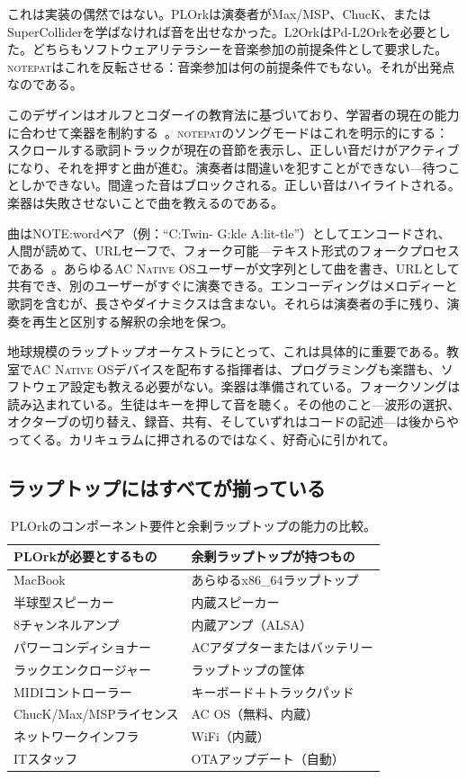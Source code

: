 \documentclass[10pt,letterpaper,twocolumn]{article}
\newcommand{\acos}{\textsc{AC Native OS}}
\newcommand{\np}{\textsc{notepat}}
\begin{document}
これは実装の偶然ではない。PLOrkは演奏者がMax/MSP、ChucK、またはSuperColliderを学ばなければ音を出せなかった。L2OrkはPd-L2Orkを必要とした。どちらもソフトウェアリテラシーを音楽参加の前提条件として要求した。\np{}はこれを反転させる：音楽参加は何の前提条件でもない。それが出発点なのである。

このデザインはオルフとコダーイの教育法に基づいており、学習者の現在の能力に合わせて楽器を制約する~\citep{scudder2026folksongs}。\np{}のソングモードはこれを明示的にする：スクロールする歌詞トラックが現在の音節を表示し、正しい音だけがアクティブになり、それを押すと曲が進む。演奏者は間違いを犯すことができない---待つことしかできない。間違った音はブロックされる。正しい音はハイライトされる。楽器は失敗させないことで曲を教えるのである。

曲はNOTE:wordペア（例：``C:Twin- G:kle A:lit-tle''）としてエンコードされ、人間が読めて、URLセーフで、フォーク可能---テキスト形式のフォークプロセスである~\citep{scudder2026folksongs}。あらゆる\acos{}ユーザーが文字列として曲を書き、URLとして共有でき、別のユーザーがすぐに演奏できる。エンコーディングはメロディーと歌詞を含むが、長さやダイナミクスは含まない。それらは演奏者の手に残り、演奏を再生と区別する解釈の余地を保つ。

地球規模のラップトップオーケストラにとって、これは具体的に重要である。教室で\acos{}デバイスを配布する指揮者は、プログラミングも楽譜も、ソフトウェア設定も教える必要がない。楽器は準備されている。フォークソングは読み込まれている。生徒はキーを押して音を聴く。その他のこと---波形の選択、オクターブの切り替え、録音、共有、そしていずれはコードの記述---は後からやってくる。カリキュラムに押されるのではなく、好奇心に引かれて。

\subsection{ラップトップにはすべてが揃っている}

\begin{table}[h]
\small
\centering
\begin{tabular}{ll}
\toprule
\textbf{PLOrkが必要とするもの} & \textbf{余剰ラップトップが持つもの} \\
\midrule
MacBook & あらゆるx86\_64ラップトップ \\
半球型スピーカー & 内蔵スピーカー \\
8チャンネルアンプ & 内蔵アンプ（ALSA） \\
パワーコンディショナー & ACアダプターまたはバッテリー \\
ラックエンクロージャー & ラップトップの筐体 \\
MIDIコントローラー & キーボード＋トラックパッド \\
ChucK/Max/MSPライセンス & AC OS（無料、内蔵） \\
ネットワークインフラ & WiFi（内蔵） \\
ITスタッフ & OTAアップデート（自動） \\
\bottomrule
\end{tabular}
\caption{PLOrkのコンポーネント要件と余剰ラップトップの能力の比較。}
\label{tab:plork-vs-surplus}
\end{table}
\end{document}
